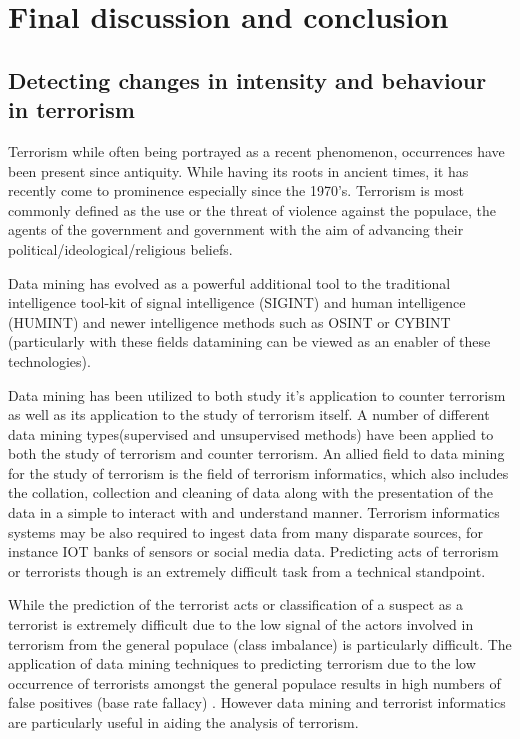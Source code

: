 \chapter{Final discussion and conclusion}

\section{Detecting changes in intensity and behaviour in terrorism}
\label{sec:chap6intro}

Terrorism while often being portrayed as a recent phenomenon, occurrences have been present since antiquity. While having its roots in ancient times, it has recently come to prominence especially since the 1970's. Terrorism is most commonly defined as the use or the threat of violence against the populace, the agents of the government and government with the aim of advancing their political/ideological/religious beliefs.

Data mining has evolved as a powerful additional tool to the traditional intelligence tool-kit of signal intelligence (SIGINT) and human intelligence (HUMINT) and newer intelligence methods such as OSINT or CYBINT (particularly with these fields datamining can be viewed as an enabler of these technologies).

Data mining has been utilized to both study it's application to counter terrorism as well as its application to the study of terrorism itself. A number of different data mining types(supervised and unsupervised  methods) have been applied to both the study of terrorism and counter terrorism. An allied field to data mining for the study of terrorism is the field of terrorism informatics, which also includes the collation, collection and cleaning of data along with the presentation of the data in a simple to interact with and understand manner. Terrorism informatics systems may be also required to ingest data from many disparate sources, for instance IOT banks of sensors or social media data. Predicting acts of terrorism or terrorists though is an extremely difficult task from a  technical standpoint. 

While the prediction of the terrorist acts or classification of a suspect as a terrorist is extremely difficult due to the low signal of the actors involved in terrorism from the general populace (class imbalance) is particularly difficult. The application of data mining techniques to predicting terrorism due to the low occurrence of terrorists amongst the general populace results in high numbers of false positives (base rate fallacy) \citep{axelsson2000base}. However data mining and terrorist informatics are particularly useful in aiding the analysis of terrorism. 

